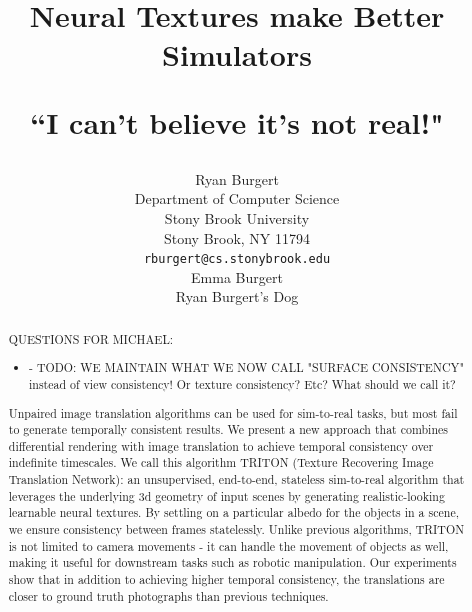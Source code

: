 \documentclass{article}
\title{Neural Textures make Better Simulators

``I can't believe it's not real!" %
 }
\author{%
	Ryan Burgert \\
	Department of Computer Science\\
	Stony Brook University\\
	Stony Brook, NY 11794 \\
	\texttt{rburgert@cs.stonybrook.edu} \\
	\And
	Emma Burgert \\
	Ryan Burgert's Dog\\
}
\begin{document}
\maketitle


\begin{abstract}


	QUESTIONS FOR MICHAEL:
	\begin{itemize}
		\item - TODO: WE MAINTAIN WHAT WE NOW CALL "SURFACE CONSISTENCY" instead of view consistency! Or texture consistency? Etc? What should we call it?
	\end{itemize}

	Unpaired image translation algorithms can be used for sim-to-real tasks, but most fail to generate temporally consistent results.
	We present a new approach that combines differential rendering with image translation to achieve temporal consistency over indefinite timescales.
%
	We call this algorithm TRITON (Texture Recovering Image Translation Network): an unsupervised, end-to-end, stateless sim-to-real algorithm that 
	leverages the underlying 3d geometry of input scenes by generating realistic-looking learnable neural textures.
%
	By settling on a particular albedo for the objects in a scene, we ensure consistency between frames statelessly.
	Unlike previous algorithms, TRITON is not limited to camera movements - it can handle the movement of objects as well, making it useful for downstream tasks such as robotic manipulation.
	Our experiments show that in addition to achieving higher temporal consistency, the translations are closer to ground truth photographs than previous techniques.

\end{abstract}
\end{document}
